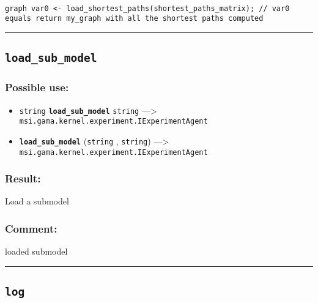 \documentclass[]{book}
\providecommand{\tightlist}{%
  \setlength{\itemsep}{0pt}\setlength{\parskip}{0pt}}
\theoremstyle{definition}
\theoremstyle{definition}
\theoremstyle{definition}
\theoremstyle{remark}
\begin{document}
\begin{verbatim}
 
graph var0 <- load_shortest_paths(shortest_paths_matrix); // var0 equals return my_graph with all the shortest paths computed
\end{verbatim}

\begin{center}\rule{0.5\linewidth}{\linethickness}\end{center}

\subsection{\texorpdfstring{\texttt{load\_sub\_model}}{load\_sub\_model}}\label{load_sub_model}

\subsubsection{Possible use:}\label{possible-use-328}

\begin{itemize}
\tightlist
\item
  \texttt{string} \textbf{\texttt{load\_sub\_model}} \texttt{string}
  ---\textgreater{} \texttt{msi.gama.kernel.experiment.IExperimentAgent}
\item
  \textbf{\texttt{load\_sub\_model}} (\texttt{string} , \texttt{string})
  ---\textgreater{} \texttt{msi.gama.kernel.experiment.IExperimentAgent}
\end{itemize}

\subsubsection{Result:}\label{result-318}

Load a submodel

\subsubsection{Comment:}\label{comment-63}

loaded submodel

\begin{center}\rule{0.5\linewidth}{\linethickness}\end{center}

\subsection{\texorpdfstring{\texttt{log}}{log}}\label{log}
\end{document}
